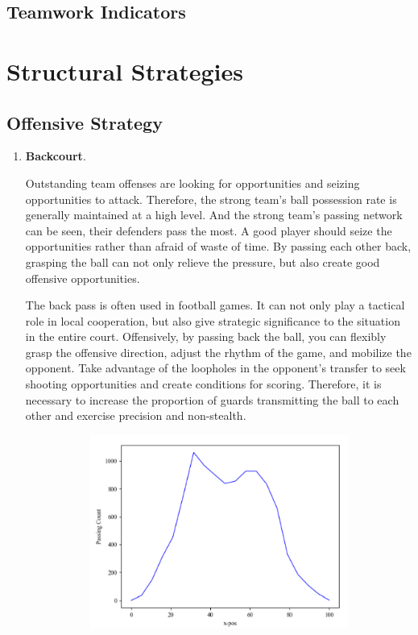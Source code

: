 \documentclass{mcmthesis}
\begin{document}
\subsection{Teamwork Indicators}
\section{Structural Strategies}
\subsection{Offensive Strategy}
\begin{enumerate}[(1)]
	\item \textbf{Backcourt}.\par
	\qquad Outstanding team offenses are looking for opportunities and seizing opportunities to attack. Therefore, the strong team's ball possession rate is generally maintained at a high level. And the strong team's passing network can be seen, their defenders pass the most. A good player should seize the opportunities rather than afraid of waste of time. By passing each other back, grasping the ball can not only relieve the pressure, but also create good offensive opportunities. \par
	\qquad The back pass is often used in football games. It can not only play a tactical role in local cooperation, but also give strategic significance to the situation in the entire court. Offensively, by passing back the ball, you can flexibly grasp the offensive direction, adjust the rhythm of the game, and mobilize the opponent. Take advantage of the loopholes in the opponent's transfer to seek shooting opportunities and create conditions for scoring. Therefore, it is necessary to increase the proportion of guards transmitting the ball to each other and exercise precision and non-stealth.
	\begin{figure}[h]
		\centering
		\begin{subfigure}[b]{0.45\textwidth}
			\includegraphics[width=\textwidth]{figures/backcourt.png}

\end{subfigure}
\end{figure}
\end{enumerate}
\end{document}
